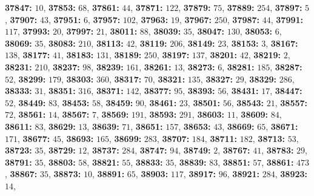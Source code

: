 \textsf{\bfseries 37847:} $10$, \textsf{\bfseries 37853:} $68$, \textsf{\bfseries 37861:} $44$, \textsf{\bfseries 37871:} $122$, \textsf{\bfseries 37879:} $75$, \textsf{\bfseries 37889:} $254$, \textsf{\bfseries 37897:} $5$, \textsf{\bfseries 37907:} $43$, \textsf{\bfseries 37951:} $6$, \textsf{\bfseries 37957:} $102$, \textsf{\bfseries 37963:} $19$, \textsf{\bfseries 37967:} $250$, \textsf{\bfseries 37987:} $44$, \textsf{\bfseries 37991:} $117$, \textsf{\bfseries 37993:} $20$, \textsf{\bfseries 37997:} $21$, \textsf{\bfseries 38011:} $88$, \textsf{\bfseries 38039:} $35$, \textsf{\bfseries 38047:} $130$, \textsf{\bfseries 38053:} $6$, \textsf{\bfseries 38069:} $35$, \textsf{\bfseries 38083:} $210$, \textsf{\bfseries 38113:} $42$, \textsf{\bfseries 38119:} $206$, \textsf{\bfseries 38149:} $23$, \textsf{\bfseries 38153:} $3$, \textsf{\bfseries 38167:} $138$, \textsf{\bfseries 38177:} $41$, \textsf{\bfseries 38183:} $131$, \textsf{\bfseries 38189:} $250$, \textsf{\bfseries 38197:} $137$, \textsf{\bfseries 38201:} $42$, \textsf{\bfseries 38219:} $2$, \textsf{\bfseries 38231:} $210$, \textsf{\bfseries 38237:} $98$, \textsf{\bfseries 38239:} $161$, \textsf{\bfseries 38261:} $13$, \textsf{\bfseries 38273:} $6$, \textsf{\bfseries 38281:} $185$, \textsf{\bfseries 38287:} $52$, \textsf{\bfseries 38299:} $179$, \textsf{\bfseries 38303:} $360$, \textsf{\bfseries 38317:} $70$, \textsf{\bfseries 38321:} $135$, \textsf{\bfseries 38327:} $29$, \textsf{\bfseries 38329:} $286$, \textsf{\bfseries 38333:} $31$, \textsf{\bfseries 38351:} $316$, \textsf{\bfseries 38371:} $142$, \textsf{\bfseries 38377:} $95$, \textsf{\bfseries 38393:} $56$, \textsf{\bfseries 38431:} $17$, \textsf{\bfseries 38447:} $52$, \textsf{\bfseries 38449:} $83$, \textsf{\bfseries 38453:} $58$, \textsf{\bfseries 38459:} $90$, \textsf{\bfseries 38461:} $23$, \textsf{\bfseries 38501:} $56$, \textsf{\bfseries 38543:} $21$, \textsf{\bfseries 38557:} $72$, \textsf{\bfseries 38561:} $14$, \textsf{\bfseries 38567:} $7$, \textsf{\bfseries 38569:} $191$, \textsf{\bfseries 38593:} $291$, \textsf{\bfseries 38603:} $11$, \textsf{\bfseries 38609:} $84$, \textsf{\bfseries 38611:} $83$, \textsf{\bfseries 38629:} $13$, \textsf{\bfseries 38639:} $71$, \textsf{\bfseries 38651:} $157$, \textsf{\bfseries 38653:} $43$, \textsf{\bfseries 38669:} $65$, \textsf{\bfseries 38671:} $171$, \textsf{\bfseries 38677:} $45$, \textsf{\bfseries 38693:} $165$, \textsf{\bfseries 38699:} $283$, \textsf{\bfseries 38707:} $184$, \textsf{\bfseries 38711:} $182$, \textsf{\bfseries 38713:} $53$, \textsf{\bfseries 38723:} $35$, \textsf{\bfseries 38729:} $12$, \textsf{\bfseries 38737:} $284$, \textsf{\bfseries 38747:} $94$, \textsf{\bfseries 38749:} $2$, \textsf{\bfseries 38767:} $41$, \textsf{\bfseries 38783:} $29$, \textsf{\bfseries 38791:} $35$, \textsf{\bfseries 38803:} $58$, \textsf{\bfseries 38821:} $55$, \textsf{\bfseries 38833:} $35$, \textsf{\bfseries 38839:} $83$, \textsf{\bfseries 38851:} $57$, \textsf{\bfseries 38861:} $473$, \textsf{\bfseries 38867:} $35$, \textsf{\bfseries 38873:} $10$, \textsf{\bfseries 38891:} $65$, \textsf{\bfseries 38903:} $117$, \textsf{\bfseries 38917:} $96$, \textsf{\bfseries 38921:} $284$, \textsf{\bfseries 38923:} $14$, 

